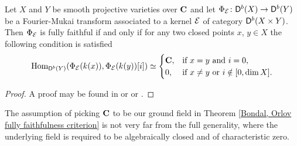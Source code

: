 \begin{theorem}
    \label{Bondal, Orlov fully faithfulness criterion}
    Let $X$ and $Y$ be smooth projective varieties over $\mathbf C$ and let $\Phi_{\mathcal E} \colon \mathsf{D}^b(X) \to \mathsf{D}^b(Y)$ be a Fourier-Mukai transform associated to a kernel $\mathcal E$ of category $\mathsf{D}^b(X \times Y)$. Then $\Phi_{\mathcal E}$ is fully faithful if and only if for any two closed points $x$, $y \in X$ the following condition is satisfied
    \begin{equation}
        \label{eq: Bondal, Orlov conditions}
        \mathrm{Hom}_{\mathsf{D}^b(Y)}(\Phi_{\mathcal E}(k(x)), \Phi_{\mathcal E}(k(y))[i]) \simeq \begin{cases}
            \mathbf C, &\text{if $x = y$ and $i = 0$,} \\
            0, &\text{if $x \neq y$ or $i \notin [0, \dim X]$.}
        \end{cases}
    \end{equation}
\end{theorem}

\begin{proof}
    A proof may be found in \cite[\S 7, Proposition 7.1]{huybrechts2006fouriermukai} or \cite[Theorem 1.1]{BondalOrlov1995} or \cite[Theorem 5.1]{bridgeland2019equivalencestriangulatedcategoriesfouriermukai}.
\end{proof}

\begin{remark}        
    The assumption of picking $\mathbf C$ to be our ground field in Theorem \ref{Bondal, Orlov fully faithfulness criterion} is not very far from the full generality, where the underlying field is required to be algebraically closed and of characteristic zero.
\end{remark}

